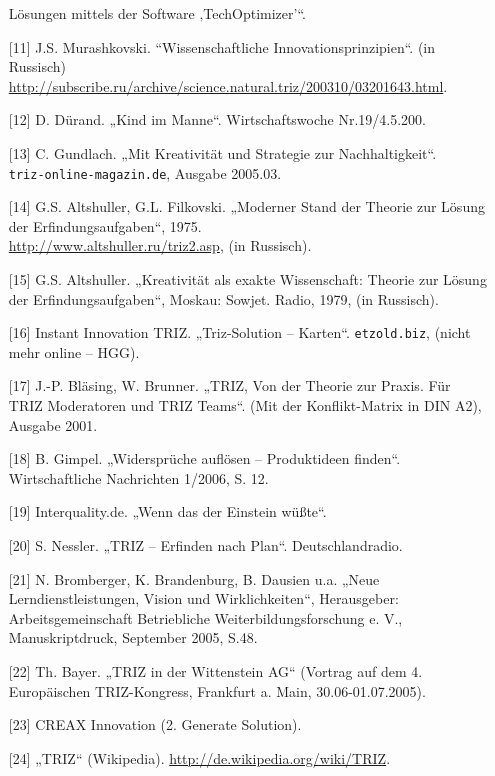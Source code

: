 \documentclass[11pt,a4paper]{article}
\begin{document}
\begin{itemize}
  Lösungen mittels der Software ‚TechOptimizer’“.
\item[{[11]}] J.S. Murashkovski. “Wissenschaftliche Innovationsprinzipien“.
  (in Russisch)\\
  \url{http://subscribe.ru/archive/science.natural.triz/200310/03201643.html}.
\item[{[12]}] D. Dürand. „Kind im Manne“. Wirtschaftswoche Nr.19/4.5.200.
\item[{[13]}] C. Gundlach. „Mit Kreativität und Strategie zur
  Nachhaltigkeit“. \\ \texttt{triz-online-magazin.de}, Ausgabe 2005.03.
\item[{[14]}] G.S. Altshuller, G.L. Filkovski. „Moderner Stand der Theorie zur
  Lösung der Erfindungsaufgaben“, 1975.\\
  \url{http://www.altshuller.ru/triz2.asp}, (in Russisch).
\item[{[15]}] G.S. Altshuller. „Kreativität als exakte Wissenschaft: Theorie
  zur Lösung der Erfindungsaufgaben“, Moskau: Sowjet. Radio, 1979, (in
  Russisch).
\item[{[16]}] Instant Innovation TRIZ. „Triz-Solution – Karten“.
  \texttt{etzold.biz}, (nicht mehr online -- HGG).
\item[{[17]}] J.-P. Bläsing, W. Brunner. „TRIZ, Von der Theorie zur Praxis.
  Für TRIZ Moderatoren und TRIZ Teams“. (Mit der Konflikt-Matrix in DIN A2),
  Ausgabe 2001.
\item[{[18]}] B. Gimpel. „Widersprüche auflösen – Produktideen finden“.
  Wirtschaftliche Nachrichten 1/2006, S. 12.
\item[{[19]}] Interquality.de. „Wenn das der Einstein wüßte“.
\item[{[20]}] S. Nessler. „TRIZ -- Erfinden nach Plan“.  Deutschlandradio.
\item[{[21]}] N. Bromberger, K. Brandenburg, B. Dausien u.a. „Neue
  Lerndienstleistungen, Vision und Wirklichkeiten“, Herausgeber:
  Arbeitsgemeinschaft Betriebliche Weiterbildungsforschung e. V.,
  Manuskriptdruck, September 2005, S.48.
\item[{[22]}] Th. Bayer. „TRIZ in der Wittenstein AG“ (Vortrag auf dem
  4. Europäischen TRIZ-Kongress, Frankfurt a. Main, 30.06-01.07.2005).
\item[{[23]}] CREAX Innovation (2. Generate Solution).
\item[{[24]}] „TRIZ“ (Wikipedia). \url{http://de.wikipedia.org/wiki/TRIZ}.
\end{itemize}

    
\end{document}
